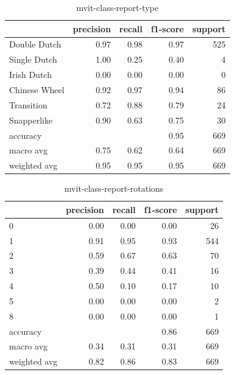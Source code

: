 \begin{table}[h!]
    \begin{tabular}{|l|r|r|r|r|}
        \hline          & precision & recall & f1-score & support \\
        \hline
        Double Dutch    &   0.97    &   0.98    &   0.97    &  525 \\
        Single Dutch    &   1.00    &   0.25    &   0.40    &  4   \\
        Irish Dutch     &   0.00    &   0.00    &   0.00    &  0   \\
        Chinese Wheel   &   0.92    &   0.97    &   0.94    &  86  \\
        Transition      &   0.72    &   0.88    &   0.79    &  24  \\
        Snapperlike     &   0.90    &   0.63    &   0.75    &  30  \\
        \hline
        accuracy        &           &           &   0.95    &  669 \\
        macro avg       &   0.75    &   0.62    &   0.64    &  669 \\
        weighted avg    &   0.95    &   0.95    &   0.95    &  669 \\ \hline
    \end{tabular}
    \caption{mvit-class-report-type}
    \label{tbl:mvit-class-report-type}
\end{table}

\begin{table}[h!]
    \begin{tabular}{|l|r|r|r|r|}
        \hline
          &  precision &   recall & f1-score &  support \\ \hline
        0 &       0.00 &     0.00 &     0.00 &       26 \\
        1 &       0.91 &     0.95 &     0.93 &      544 \\
        2 &       0.59 &     0.67 &     0.63 &       70 \\
        3 &       0.39 &     0.44 &     0.41 &       16 \\
        4 &       0.50 &     0.10 &     0.17 &       10 \\
        5 &       0.00 &     0.00 &     0.00 &        2 \\
        8 &       0.00 &     0.00 &     0.00 &        1 \\
        \hline
        accuracy &            &          &     0.86 &      669 \\
        macro avg &       0.34 &     0.31 &     0.31 &      669 \\
        weighted avg &       0.82 &     0.86 &     0.83 &      669 \\ \hline
    \end{tabular}
    \caption{mvit-class-report-rotations}
    \label{tbl:mvit-class-report-rotations}
\end{table}

